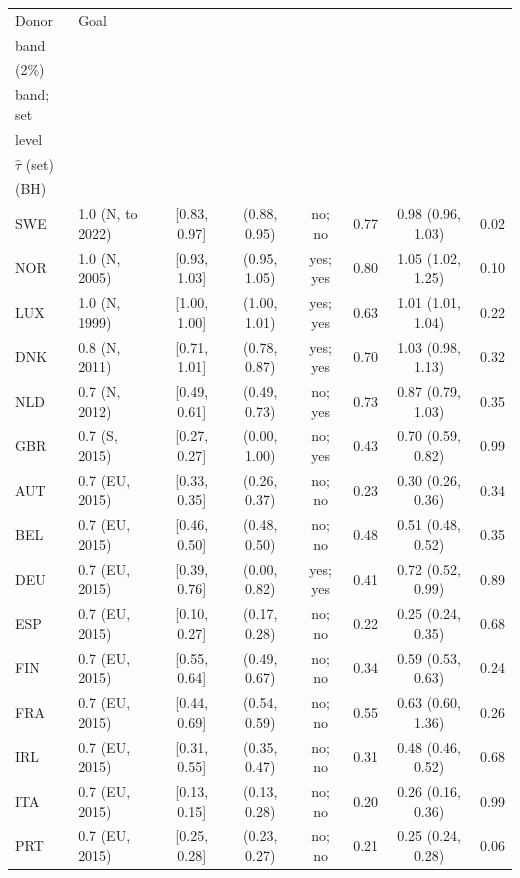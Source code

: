 \begin{tabular}{llcccccc}\toprule
Donor & Goal & \hd{Revealed\\band} & \hd{$\tau$ set\\(2\%)} & \hd{Goal in\\band; set} & \hd{Mean\\level} & \hd{GNI-adjusted\\$\hat\tau$ (set)} & \hd{Both tests\\(BH)}\\\midrule
SWE & 1.0 (N, to 2022) & [0.83, 0.97] & (0.88, 0.95) & no; no & 0.77 & 0.98 (0.96, 1.03) & 0.02\\
NOR & 1.0 (N, 2005) & [0.93, 1.03] & (0.95, 1.05) & yes; yes & 0.80 & 1.05 (1.02, 1.25) & 0.10\\
LUX & 1.0 (N, 1999) & [1.00, 1.00] & (1.00, 1.01) & yes; yes & 0.63 & 1.01 (1.01, 1.04) & 0.22\\
DNK & 0.8 (N, 2011) & [0.71, 1.01] & (0.78, 0.87) & yes; yes & 0.70 & 1.03 (0.98, 1.13) & 0.32\\
NLD & 0.7 (N, 2012) & [0.49, 0.61] & (0.49, 0.73) & no; yes & 0.73 & 0.87 (0.79, 1.03) & 0.35\\
GBR & 0.7 (S, 2015) & [0.27, 0.27] & (0.00, 1.00) & no; yes & 0.43 & 0.70 (0.59, 0.82) & 0.99\\
AUT & 0.7 (EU, 2015) & [0.33, 0.35] & (0.26, 0.37) & no; no & 0.23 & 0.30 (0.26, 0.36) & 0.34\\
BEL & 0.7 (EU, 2015) & [0.46, 0.50] & (0.48, 0.50) & no; no & 0.48 & 0.51 (0.48, 0.52) & 0.35\\
DEU & 0.7 (EU, 2015) & [0.39, 0.76] & (0.00, 0.82) & yes; yes & 0.41 & 0.72 (0.52, 0.99) & 0.89\\
ESP & 0.7 (EU, 2015) & [0.10, 0.27] & (0.17, 0.28) & no; no & 0.22 & 0.25 (0.24, 0.35) & 0.68\\
FIN & 0.7 (EU, 2015) & [0.55, 0.64] & (0.49, 0.67) & no; no & 0.34 & 0.59 (0.53, 0.63) & 0.24\\
FRA & 0.7 (EU, 2015) & [0.44, 0.69] & (0.54, 0.59) & no; no & 0.55 & 0.63 (0.60, 1.36) & 0.26\\
IRL & 0.7 (EU, 2015) & [0.31, 0.55] & (0.35, 0.47) & no; no & 0.31 & 0.48 (0.46, 0.52) & 0.68\\
ITA & 0.7 (EU, 2015) & [0.13, 0.15] & (0.13, 0.28) & no; no & 0.20 & 0.26 (0.16, 0.36) & 0.99\\
PRT & 0.7 (EU, 2015) & [0.25, 0.28] & (0.23, 0.27) & no; no & 0.21 & 0.25 (0.24, 0.28) & 0.06\\
\bottomrule\end{tabular}